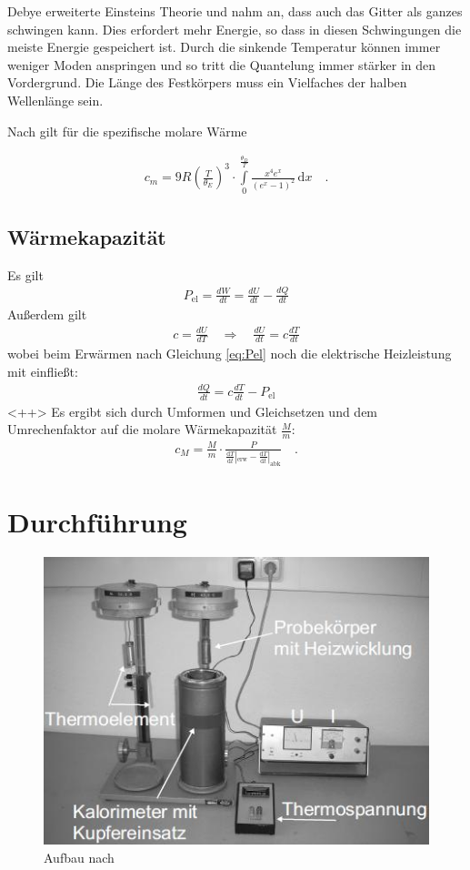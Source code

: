\documentclass[12pt,a4paper,titlepage,headinclude,bibtotoc]{scrartcl}
\newcommand{\dif}{\ensuremath{\mathrm{d}}}
\begin{document}
Debye erweiterte Einsteins Theorie und nahm an, dass auch das Gitter als ganzes schwingen kann.
Dies erfordert mehr Energie, so dass in diesen Schwingungen die meiste Energie gespeichert ist.
Durch die sinkende Temperatur können immer weniger Moden anspringen und so tritt die Quantelung immer stärker in den Vordergrund.
Die Länge des Festkörpers muss ein Vielfaches der halben Wellenlänge sein.

Nach \cite[S. 444]{demtroeder3} gilt für die spezifische molare Wärme

\begin{align}
	c_m=9R \left(\frac{T}{\theta_E}\right)^3\cdot\int\limits_0^\frac{\theta_D}{T} \frac{x^4 e^x}{(e^x-1)^2} \,\dif x\quad .	\label{eq:debye}
\end{align}


\subsection{Wärmekapazität}
Es gilt 
\begin{align}
	P_\text{el}=\frac{dW}{dt}=\frac{dU}{dt}-\frac{dQ}{dt}\label{eq:Pel}
\end{align}
Außerdem gilt
\begin{align*}
	c=\frac{dU}{dT}\quad\Rightarrow\quad \frac{dU}{dt}=c\frac{dT}{dt}
\end{align*}
wobei beim Erwärmen nach Gleichung \eqref{eq:Pel} noch die elektrische Heizleistung mit einfließt:
\begin{align}
	\frac{dQ}{dt}=c\frac{dT}{dt}-P_\text{el}
\end{align}<++>
Es ergibt sich durch Umformen und Gleichsetzen und dem Umrechenfaktor auf die molare Wärmekapazität $\frac{M}{m}$:
\begin{align}
	c_M=\frac{M}{m}\cdot\frac{P}{\frac{\dif T}{\dif t}|_\text{erw}-\frac{\dif T}{\dif t}|_\text{abk}}\label{eq:molWaerme}\quad .
\end{align}

\section{Durchführung}
\label{sec:durchfuehrung}

\begin{figure}[h]
	\centering
	\includegraphics{Aufbau}
	\caption{Aufbau nach \cite[23.4.15, 13 Uhr]{lp25}}
	\label{fig:aufbau}
\end{figure}
\end{document}
